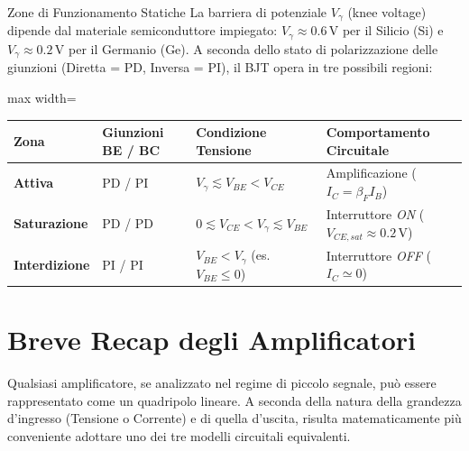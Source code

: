 \vspace{0.3cm}
\begin{osservazione}{Zone di Funzionamento Statiche}
    La barriera di potenziale $V_\gamma$ (knee voltage) dipende dal materiale semiconduttore impiegato: $V_\gamma \approx 0.6\,\mathrm{V}$ per il Silicio (Si) e $V_\gamma \approx 0.2\,\mathrm{V}$ per il Germanio (Ge). A seconda dello stato di polarizzazione delle giunzioni (Diretta = PD, Inversa = PI), il BJT opera in tre possibili regioni:

    \begin{center}
    \begin{adjustbox}{max width=\textwidth}
    \renewcommand{\arraystretch}{1.2}
    \begin{tabular}{llll}
        \hline
        \textbf{Zona} & \textbf{Giunzioni BE / BC} & \textbf{Condizione Tensione} & \textbf{Comportamento Circuitale} \\
        \hline
        \textbf{Attiva}      & PD / PI & $V_\gamma \lesssim V_{BE} < V_{CE}$ & Amplificazione ($I_C = \beta_F I_B$) \\
        \textbf{Saturazione} & PD / PD & $0 \lesssim V_{CE} < V_\gamma \lesssim V_{BE}$ & Interruttore \emph{ON} ($V_{CE,sat} \approx 0.2\,\mathrm{V}$) \\
        \textbf{Interdizione} & PI / PI & $V_{BE} < V_\gamma$ (es. $V_{BE} \le 0$) & Interruttore \emph{OFF} ($I_C \simeq 0$) \\
        \hline
    \end{tabular}
    \end{adjustbox}
    \end{center}
\end{osservazione}


\section{Breve Recap degli Amplificatori}
Qualsiasi amplificatore, se analizzato nel regime di piccolo segnale, può essere rappresentato come un quadripolo lineare. A seconda della natura della grandezza d'ingresso (Tensione o Corrente) e di quella d'uscita, risulta matematicamente più conveniente adottare uno dei tre modelli circuitali equivalenti.

